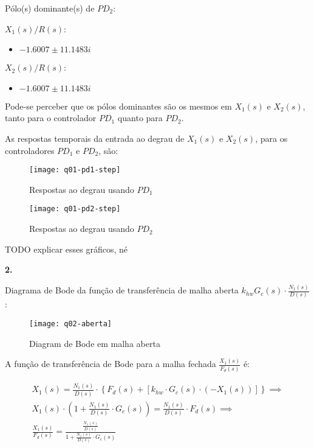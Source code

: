 \documentclass[a4paper,11pt]{article}
\begin{document}
Pólo(s) dominante(s) de $PD_2$:

\begin{multicols}{2}
    $X_1\left(s\right) / R\left(s\right)$:
    \begin{itemize}
        \item $-1.6007 \pm 11.1483i$
    \end{itemize}
\columnbreak
    $X_2\left(s\right) / R\left(s\right)$:
    \begin{itemize}
        \item $-1.6007 \pm 11.1483i$
    \end{itemize}
\end{multicols}

Pode-se perceber que os pólos dominantes são os mesmos em $X_1\left(s\right)$ e
$X_2\left(s\right)$, tanto para o controlador $PD_1$ quanto para $PD_2$.

\pagebreak

As respostas temporais da entrada ao degrau de $X_1\left(s\right)$ e
$X_2\left(s\right)$, para os controladores $PD_1$ e $PD_2$, são:

\begin{figure}[H]
\centering
\texttt{[image: q01-pd1-step]}
\caption{Respostas ao degrau usando $PD_1$}
\end{figure}

\begin{figure}[H]
\centering
\texttt{[image: q01-pd2-step]}
\caption{Respostas ao degrau usando $PD_2$}
\end{figure}

TODO explicar esses gráficos, né

\textbf{2.}

Diagrama de Bode da função de transferência de malha aberta
$k_{hw} G_c\left(s\right) \cdot \frac{N_1\left(s\right)}{D\left(s\right)}$:

\begin{figure}[H]
\centering
\texttt{[image: q02-aberta]}
\caption{Diagram de Bode em malha aberta}
\end{figure}

A função de transferência de Bode para a malha fechada
$\frac{X_1\left(s\right)}{F_d\left(s\right)}$ é:

\begin{gather*}
    X_1\left(s\right) = \frac{N_1\left(s\right)}{D\left(s\right)} \cdot
        \left\{F_d\left(s\right) + \left[k_{hw} \cdot G_c\left(s\right) \cdot
        \left(- X_1\left(s\right)\right)\right]\right\} \implies \\
    X_1\left(s\right) \cdot \left(1 + \frac{N_1\left(s\right)}{D\left(s\right)}
        \cdot G_c\left(s\right)\right) =
        \frac{N_1\left(s\right)}{D\left(s\right)} \cdot F_d\left(s\right)
        \implies \\
    \frac{X_1\left(s\right)}{F_d\left(s\right)} =
        \frac{\frac{N_1\left(s\right)}{D\left(s\right)}}{1 +
        \frac{N_1\left(s\right)}{D\left(s\right)} \cdot G_c\left(s\right)}
\end{gather*}
\end{document}
